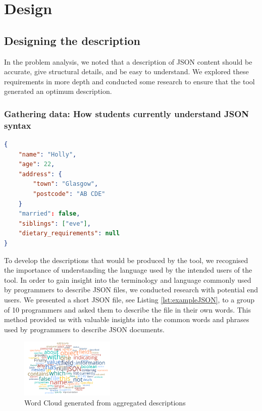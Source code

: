 \documentclass{l4proj}
\begin{document}
\chapter{Design}

\section{Designing the description}

In the problem analysis, we noted that a description of JSON content should be accurate, give structural details, and be easy to understand. We explored these requirements in more depth and conducted some research to ensure that the tool generated an optimum description.

\subsection{Gathering data: How students currently understand JSON syntax}

\small
\begin{lstlisting}[language=JSON,caption=JSON File participants were requested to describe, label=lst:exampleJSON]
{ 
    "name": "Holly",
    "age": 22,
    "address": {
        "town": "Glasgow",
        "postcode": "AB CDE"
    }
    "married": false,
    "siblings": ["eve"],
    "dietary_requirements": null
}
\end{lstlisting}

To develop the descriptions that would be produced by the tool, we recognised the importance of understanding the language used by the intended users of the tool. In order to gain insight into the terminology and language commonly used by programmers to describe JSON files, we conducted research with potential end users. We presented a short JSON file, see Listing \ref{lst:exampleJSON},  to a group of 10 programmers and asked them to describe the file in their own words. This method provided us with valuable insights into the common words and phrases used by programmers to describe JSON documents. 

\begin{figure} %
    \centering
    \includegraphics[width=0.4\textwidth]{dissertation/images/Word cloud.png}
    \caption{Word Cloud generated from aggregated descriptions}
    \label{fig:word_cloud}
\end{figure}
\end{document}
